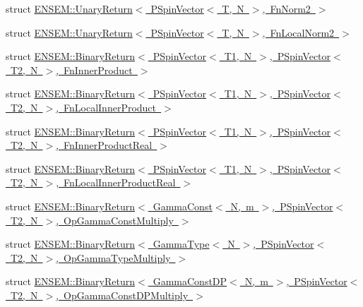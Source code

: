 \begin{DoxyCompactItemize}
\item 
struct \mbox{\hyperlink{structENSEM_1_1UnaryReturn_3_01PSpinVector_3_01T_00_01N_01_4_00_01FnNorm2_01_4}{E\+N\+S\+E\+M\+::\+Unary\+Return$<$ P\+Spin\+Vector$<$ T, N $>$, Fn\+Norm2 $>$}}
\item 
struct \mbox{\hyperlink{structENSEM_1_1UnaryReturn_3_01PSpinVector_3_01T_00_01N_01_4_00_01FnLocalNorm2_01_4}{E\+N\+S\+E\+M\+::\+Unary\+Return$<$ P\+Spin\+Vector$<$ T, N $>$, Fn\+Local\+Norm2 $>$}}
\item 
struct \mbox{\hyperlink{structENSEM_1_1BinaryReturn_3_01PSpinVector_3_01T1_00_01N_01_4_00_01PSpinVector_3_01T2_00_01N_01_4_00_01FnInnerProduct_01_4}{E\+N\+S\+E\+M\+::\+Binary\+Return$<$ P\+Spin\+Vector$<$ T1, N $>$, P\+Spin\+Vector$<$ T2, N $>$, Fn\+Inner\+Product $>$}}
\item 
struct \mbox{\hyperlink{structENSEM_1_1BinaryReturn_3_01PSpinVector_3_01T1_00_01N_01_4_00_01PSpinVector_3_01T2_00_01N_0165efe80400678b53a582cdf54c5c66b4}{E\+N\+S\+E\+M\+::\+Binary\+Return$<$ P\+Spin\+Vector$<$ T1, N $>$, P\+Spin\+Vector$<$ T2, N $>$, Fn\+Local\+Inner\+Product $>$}}
\item 
struct \mbox{\hyperlink{structENSEM_1_1BinaryReturn_3_01PSpinVector_3_01T1_00_01N_01_4_00_01PSpinVector_3_01T2_00_01N_01_4_00_01FnInnerProductReal_01_4}{E\+N\+S\+E\+M\+::\+Binary\+Return$<$ P\+Spin\+Vector$<$ T1, N $>$, P\+Spin\+Vector$<$ T2, N $>$, Fn\+Inner\+Product\+Real $>$}}
\item 
struct \mbox{\hyperlink{structENSEM_1_1BinaryReturn_3_01PSpinVector_3_01T1_00_01N_01_4_00_01PSpinVector_3_01T2_00_01N_01af7fecc465148c326d536be8c96c14c3}{E\+N\+S\+E\+M\+::\+Binary\+Return$<$ P\+Spin\+Vector$<$ T1, N $>$, P\+Spin\+Vector$<$ T2, N $>$, Fn\+Local\+Inner\+Product\+Real $>$}}
\item 
struct \mbox{\hyperlink{structENSEM_1_1BinaryReturn_3_01GammaConst_3_01N_00_01m_01_4_00_01PSpinVector_3_01T2_00_01N_01_4_00_01OpGammaConstMultiply_01_4}{E\+N\+S\+E\+M\+::\+Binary\+Return$<$ Gamma\+Const$<$ N, m $>$, P\+Spin\+Vector$<$ T2, N $>$, Op\+Gamma\+Const\+Multiply $>$}}
\item 
struct \mbox{\hyperlink{structENSEM_1_1BinaryReturn_3_01GammaType_3_01N_01_4_00_01PSpinVector_3_01T2_00_01N_01_4_00_01OpGammaTypeMultiply_01_4}{E\+N\+S\+E\+M\+::\+Binary\+Return$<$ Gamma\+Type$<$ N $>$, P\+Spin\+Vector$<$ T2, N $>$, Op\+Gamma\+Type\+Multiply $>$}}
\item 
struct \mbox{\hyperlink{structENSEM_1_1BinaryReturn_3_01GammaConstDP_3_01N_00_01m_01_4_00_01PSpinVector_3_01T2_00_01N_01c511155a335117739782ed7ccba11d26}{E\+N\+S\+E\+M\+::\+Binary\+Return$<$ Gamma\+Const\+D\+P$<$ N, m $>$, P\+Spin\+Vector$<$ T2, N $>$, Op\+Gamma\+Const\+D\+P\+Multiply $>$}}

\end{DoxyCompactItemize}
